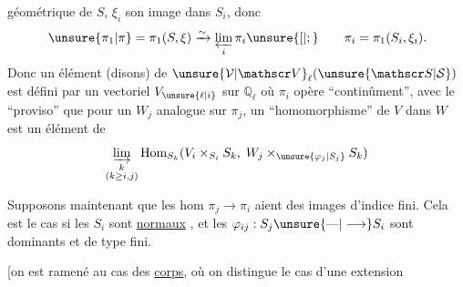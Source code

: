 géométrique de $S$, $\xi_i$ son image dans $S_i$, donc
\[
\unsure{\pi_1|\pi}=\pi_1(S,\xi)\xrightarrow{\sim}\varprojlim_i\pi_i\unsure{[|;}\qquad \pi_i=\pi_1(S_i,\xi_i).
\]
Donc un élément (disons) de $\unsure{\mathcal V|\mathscr V}_\ell(\unsure{\mathscr S|\mathcal S})$  est défini par un vectoriel $V_{\unsure{\ell|i}}$ sur $\mathbb Q_\ell$ où $\pi_i$ opère ``continûment'', avec le ``proviso'' que pour un $W_j$ analogue sur $\pi_j$, un ``homomorphisme'' de $V$ dans $W$ est un élément de
\[
\varinjlim_{\substack{k\\(k\geq i,j)}}\operatorname{Hom}_{S_k}(V_i\times_{S_i}S_k,\;W_j\times_{\unsure{\varphi_j|S_j}}S_k)
\]

\margin{\rule{0.4pt}{6\baselineskip}}
Supposons maintenant que  les  hom  $\pi_j\longrightarrow\pi_i$ aient des images d'indice fini. Cela est le cas si les $S_i$ sont \uline{normaux} , et les $\varphi_{ij}:S_j\unsure{\text{---}|\longrightarrow}S_i$ sont dominants et  de type fini.

[on est ramené au cas des \uline{corps}, où on distingue le cas d'une extension 
